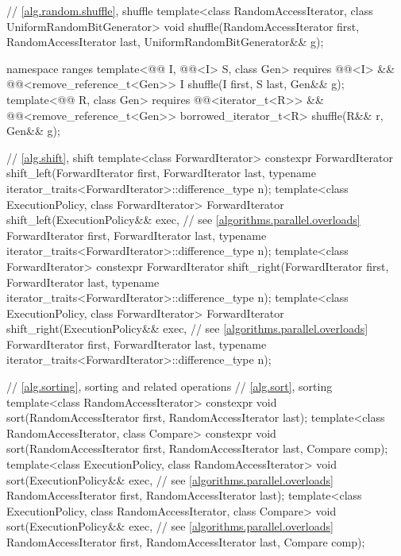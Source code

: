 \begin{codeblock}
{  // \ref{alg.random.shuffle}, shuffle
  template<class RandomAccessIterator, class UniformRandomBitGenerator>
    void shuffle(RandomAccessIterator first,
                 RandomAccessIterator last,
                 UniformRandomBitGenerator&& g);

  namespace ranges {
    template<@@ I, @@<I> S, class Gen>
      requires @@<I> &&
               @@<remove_reference_t<Gen>>
      I shuffle(I first, S last, Gen&& g);
    template<@@ R, class Gen>
      requires @@<iterator_t<R>> &&
               @@<remove_reference_t<Gen>>
      borrowed_iterator_t<R> shuffle(R&& r, Gen&& g);
  }

  // \ref{alg.shift}, shift
  template<class ForwardIterator>
    constexpr ForwardIterator
      shift_left(ForwardIterator first, ForwardIterator last,
                 typename iterator_traits<ForwardIterator>::difference_type n);
  template<class ExecutionPolicy, class ForwardIterator>
    ForwardIterator
      shift_left(ExecutionPolicy&& exec,                        // see \ref{algorithms.parallel.overloads}
                 ForwardIterator first, ForwardIterator last,
                 typename iterator_traits<ForwardIterator>::difference_type n);
  template<class ForwardIterator>
    constexpr ForwardIterator
      shift_right(ForwardIterator first, ForwardIterator last,
                  typename iterator_traits<ForwardIterator>::difference_type n);
  template<class ExecutionPolicy, class ForwardIterator>
    ForwardIterator
      shift_right(ExecutionPolicy&& exec,                       // see \ref{algorithms.parallel.overloads}
                  ForwardIterator first, ForwardIterator last,
                  typename iterator_traits<ForwardIterator>::difference_type n);

  // \ref{alg.sorting}, sorting and related operations
  // \ref{alg.sort}, sorting
  template<class RandomAccessIterator>
    constexpr void sort(RandomAccessIterator first, RandomAccessIterator last);
  template<class RandomAccessIterator, class Compare>
    constexpr void sort(RandomAccessIterator first, RandomAccessIterator last,
                        Compare comp);
  template<class ExecutionPolicy, class RandomAccessIterator>
    void sort(ExecutionPolicy&& exec,                           // see \ref{algorithms.parallel.overloads}
              RandomAccessIterator first, RandomAccessIterator last);
  template<class ExecutionPolicy, class RandomAccessIterator, class Compare>
    void sort(ExecutionPolicy&& exec,                           // see \ref{algorithms.parallel.overloads}
              RandomAccessIterator first, RandomAccessIterator last,
              Compare comp);

}
\end{codeblock}
